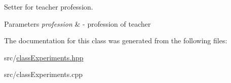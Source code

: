 Setter for teacher profession. 


\begin{DoxyParams}{Parameters}
{\em profession} & -\/ profession of teacher \\
\hline
\end{DoxyParams}


The documentation for this class was generated from the following files\+:\begin{DoxyCompactItemize}
\item 
src/\hyperlink{classExperiments_8hpp}{class\+Experiments.\+hpp}\item 
src/class\+Experiments.\+cpp\end{DoxyCompactItemize}
